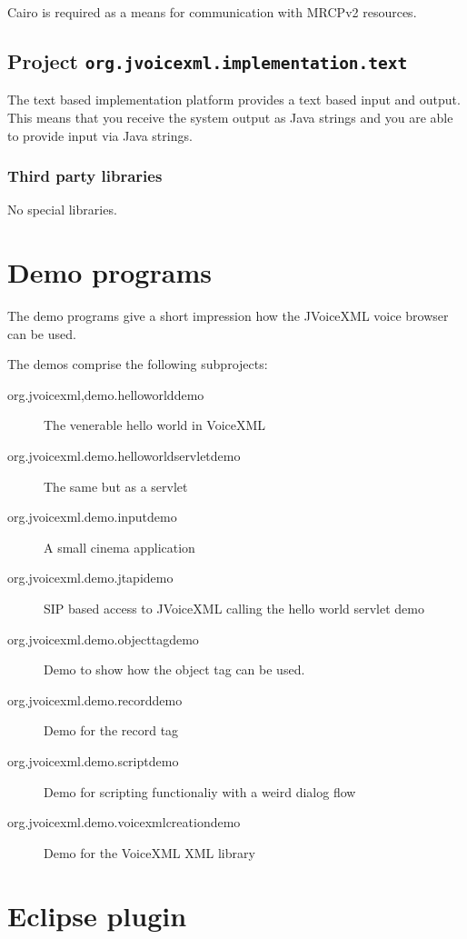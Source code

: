 \documentclass[11pt,a4paper]{article}
\begin{document}
Cairo is required as a means for communication with MRCPv2 resources.

\subsection{Project \lstinline{org.jvoicexml.implementation.text}}

The text based implementation platform provides a text based input and output.
This means that you receive the system output as Java strings and you are able
to provide input via Java strings.

\subsubsection{Third party libraries}
\label{sec:text-third-party-libr}

No special libraries.

\section{Demo programs}

The demo programs give a short impression how the JVoiceXML voice browser can
be used.

The demos comprise the following subprojects:

\begin{description}
\item[org.jvoicexml,demo.helloworlddemo] The venerable hello world in VoiceXML
\item[org.jvoicexml.demo.helloworldservletdemo] The same but as a servlet
\item[org.jvoicexml.demo.inputdemo] A small cinema application
\item[org.jvoicexml.demo.jtapidemo] SIP based access to JVoiceXML calling the
hello world servlet demo
\item[org.jvoicexml.demo.objecttagdemo] Demo to show how the object tag can be
used.
\item[org.jvoicexml.demo.recorddemo] Demo for the record tag
\item[org.jvoicexml.demo.scriptdemo] Demo for scripting functionaliy with a
weird dialog flow
\item[org.jvoicexml.demo.voicexmlcreationdemo] Demo for the VoiceXML XML library
\end{description}

\section{Eclipse plugin}
\end{document}
